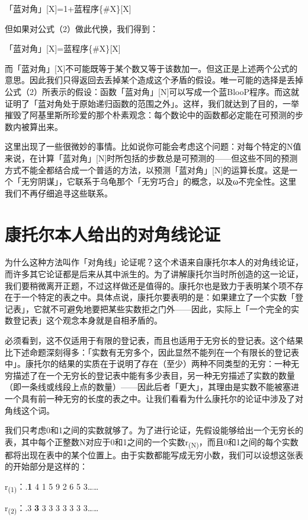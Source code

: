 \documentclass[
  12pt,
  twoside,
  openright,
  oldfontcommands,
]{memoir}
\newcommand{\heititext}[1]{{\heifamily\bfseries #1}}
\begin{document}
「蓝对角」{[}X{]}=1+蓝程序\{\#X\}{[}X{]}

但如果对公式（2）做此代换，我们得到：

「蓝对角」{[}X{]}=蓝程序\{\#X\}{[}X{]}

而「蓝对角」{[}X{]}不可能既等于某个数又等于该数加一。但这正是上述两个公式的意思。因此我们只得返回去丢掉某个造成这个矛盾的假设。唯一可能的选择是丢掉公式（2）所表示的假设：函数「蓝对角」{[}N{]}可以写成一个蓝BlooP程序。而这就证明了「蓝对角处于原始递归函数的范围之外」。这样，我们就达到了目的，一举摧毁了阿基里斯所珍爱的那个朴素观念：每个数论中的函数都必定能在可预测的步数内被算出来。

这里出现了一些很微妙的事情。比如说你可能会考虑这个问题：对每个特定的N值来说，在计算「蓝对角」{[}N{]}时所包括的步数总是可预测的------但这些不同的预测方式不能全都结合成一个普适的方法，以预测「蓝对角」{[}N{]}的运算长度。这是一个「无穷阴谋」，它联系于乌龟那个「无穷巧合」的概念，以及ω不完全性。这里我们不再仔细追寻这些联系。

\section{康托尔本人给出的对角线论证}

为什么这种方法叫作「对角线」论证呢？这个术语来自康托尔本人的对角线论证，而许多其它论证都是后来从其中派生的。为了讲解康托尔当时所创造的这一论证，我们要稍微离开正题，不过这样做还是值得的。康托尔也是致力于表明某个项不存在于一个特定的表之中。具体点说，康托尔要表明的是：如果建立了一个实数「登记表」，它就不可避免地要把某些实数拒之门外------因此，实际上「一个完全的实数登记表」这个观念本身就是自相矛盾的。

必须看到，这不仅适用于有限的登记表，而且也适用于无穷长的登记表。这个结果比下述命题深刻得多：「实数有无穷多个，因此显然不能列在一个有限长的登记表中」。康托尔的结果的实质在于说明了存在（至少）两种不同类型的无穷：一种无穷描述了在一个无穷长的登记表中能有多少表目，另一种无穷描述了实数的数量（即一条线或线段上点的数量）------因此后者「更大」，其理由是实数不能被塞进一个具有前一种无穷的长度的表之中。让我们看看为什么康托尔的论证中涉及了对角线这个词。

我们只考虑0和1之间的实数就够了。为了进行论证，先假设能够给出一个无穷长的表，其中每个正整数N对应于0和1之间的一个实数r\textsubscript{(N)}，而且0和1之间的每个实数都将出现在表中的某个位置上。由于实数都能写成无穷小数，我们可以设想这张表的开始部分是这样的：

r\textsubscript{(1)}：.\heititext{1} 4 1 5 9 2 6 5 3\ldots\ldots{}

r\textsubscript{(2)}：.3 \heititext{3} 3 3 3 3 3 3 3\ldots\ldots{}
\end{document}
